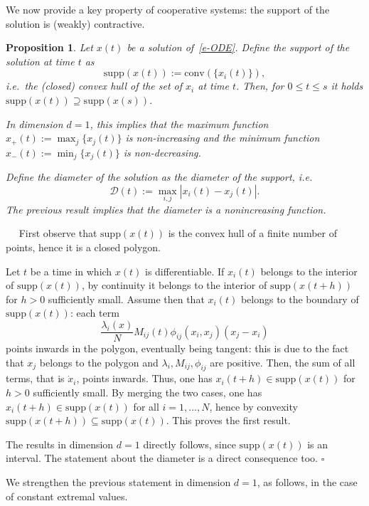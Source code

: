 \documentclass[journal]{article}
\newtheorem{proposition}[lemma]{Proposition}
\newenvironment{proof}{{\it Proof.}~~}{\hfill$\square$}
\newcommand{\diam}[1]{\mathcal{D}(#1)}
\begin{document}
We now provide a key property of cooperative systems: the support of the solution is (weakly) contractive.\begin{proposition} \label{p-contractive} Let $x(t)$ be a solution of~\eqref{e-ODE}. Define the support of the solution at time $t$ as
\begin{equation}\label{e-support}
\mathrm{supp}(x(t)):=\mathrm{conv}(\{x_i(t)\}),
\end{equation} i.e.~the (closed) convex hull of the set of $x_i$ at time $t$. Then, for $0\leq t\leq s$ it holds $\mathrm{supp}(x(t))\supseteq \mathrm{supp}(x(s))$. 

In dimension $d=1$, this implies that the maximum function $x_+(t):=\max_j\{x_j(t)\}$ is non-increasing and the minimum function $x_-(t):=\min_j\{x_j(t)\}$ is non-decreasing.

Define the diameter of the solution as the diameter of the support, i.e.
$$\diam{t}:=\max_{i,j}|x_i(t)-x_j(t)|.$$
The previous result implies that the diameter is a nonincreasing function.
\end{proposition}
\begin{proof} First observe that $\mathrm{supp}(x(t))$ is the convex hull of a finite number of points, hence it is a closed polygon.

Let $t$ be a time in which $x(t)$ is differentiable. If $x_i(t)$ belongs to the interior of $\mathrm{supp}(x(t))$, by continuity it belongs to the interior of $\mathrm{supp}(x(t+h))$ for $h>0$ sufficiently small. Assume then that $x_i(t)$ belongs to the boundary of $\mathrm{supp}(x(t))$: each term 
$$\frac{\lambda_i(x)}N M_{ij}(t)\phi_{ij}(x_i,x_j)(x_j-x_i)$$
points inwards in the polygon, eventually being tangent: this is due to the fact that $x_j$ belongs to the polygon and $\lambda_i,M_{ij},\phi_{ij}$ are positive. Then, the sum of all terms, that is $\dot x_i$, points inwards. Thus, one has $x_i(t+h)\in \mathrm{supp}(x(t))$ for $h>0$ sufficiently small. By merging the two cases, one has $x_i(t+h)\in \mathrm{supp}(x(t))$ for all $i=1,\ldots,N$, hence by convexity $\mathrm{supp}(x(t+h))\subseteq \mathrm{supp}(x(t))$. This proves the first result.

The results in dimension $d=1$ directly follows, since $\mathrm{supp}(x(t))$ is an interval. The statement about the diameter is a direct consequence too. \end{proof}

We strengthen the previous statement in dimension $d=1$, as follows, in the case of constant extremal values.
\end{document}
